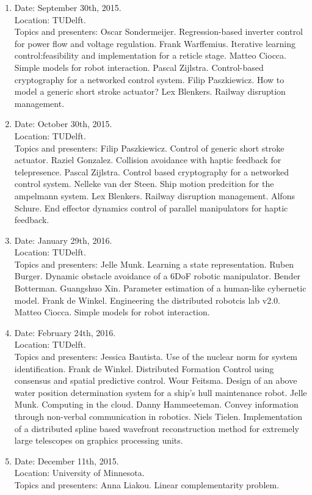 \documentclass[main.tex]{subfiles}
\begin{document}
\begin{enumerate}
	\item Date: September 30th, 2015.\\
	Location: TUDelft.\\
	Topics and presenters: 
	\subitem Oscar Sondermeijer. Regression-based inverter control for power flow and voltage regulation.
	\subitem Frank Warffemius. Iterative learning control:feasibility and implementation for a reticle stage.
	\subitem Matteo Ciocca. Simple models for robot interaction.
	\subitem Pascal Zijlstra. Control-based cryptography for a networked control system.
	\subitem Filip Paszkiewicz. How to model a generic short stroke actuator?
	\subitem Lex Blenkers. Railway disruption management.
	
	\item Date: October 30th, 2015.\\
	Location: TUDelft.\\
	Topics and presenters: 
	\subitem Filip Paszkiewicz. Control of generic short stroke actuator.
	\subitem Raziel Gonzalez. Collision avoidance with haptic feedback for telepresence.
	\subitem Pascal Zijlstra. Control based cryptography for a networked control system.
	\subitem Nelleke van der Steen. Ship motion predcition for the ampelmann system.
	\subitem Lex Blenkers. Railway disruption management.
	\subitem Alfons Schure. End effector dynamics control of parallel manipulators for haptic feedback.
	
	\item Date: January 29th, 2016.\\
	Location: TUDelft.\\
	Topics and presenters: 
	\subitem Jelle Munk. Learning a state representation.
	\subitem Ruben Burger. Dynamic obstacle avoidance of a 6DoF robotic manipulator.
	\subitem Bender Botterman.
	\subitem Guangshuo Xin. Parameter estimation of a human-like cybernetic model.
	\subitem Frank de Winkel. Engineering the distributed robotcis lab v2.0.
	\subitem Matteo Ciocca. Simple models for robot interaction.
	
	\item Date: February 24th, 2016.\\
	Location: TUDelft.\\
	Topics and presenters:
	\subitem Jessica Bautista. Use of the nuclear norm for system identification.
	\subitem Frank de Winkel. Distributed Formation Control using consensus and spatial predictive control.
	\subitem Wour Feitsma. Design of an above water position determination system for a ship's hull maintenance robot.
	\subitem Jelle Munk. Computing in the cloud.
	\subitem Danny Hammeeteman. Convey information through non-verbal communication in robotics.
	\subitem Niels Tielen. Implementation of a distributed spline based wavefront reconstruction method for extremely large telescopes on graphics processing units.
	
	\item Date: December 11th, 2015.\\
	Location: University of Minnesota.\\
	Topics and presenters: 
	\subitem Anna Liakou. Linear complementarity problem.

\end{enumerate}
\end{document}
